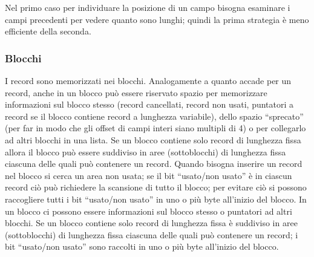 Nel primo caso per individuare la posizione di un campo bisogna esaminare i campi precedenti per
vedere quanto sono lunghi; quindi la prima strategia è meno efficiente della seconda. 

\subsubsection{Blocchi}
I record sono memorizzati nei blocchi. Analogamente a quanto accade per un record, anche in un blocco 
può essere riservato spazio per memorizzare informazioni sul blocco stesso (record cancellati, record 
non usati, puntatori a record se il blocco contiene record a lunghezza variabile), dello spazio 
``sprecato'' (per far in modo che gli offset di campi interi siano multipli di 4) o per collegarlo ad altri 
blocchi in una lista. Se un blocco contiene solo record di lunghezza fissa allora il blocco può essere 
suddiviso in aree (sottoblocchi) di lunghezza fissa ciascuna delle quali può contenere un record. Quando 
bisogna inserire un record nel blocco si cerca un area non usata; se il bit ``usato/non usato'' è in ciascun record
ciò può richiedere la scansione di tutto il blocco; per evitare ciò si possono raccogliere tutti i bit
``usato/non usato'' in uno o più byte all'inizio del blocco. 
In un blocco ci possono essere informazioni sul blocco stesso o puntatori ad altri blocchi.
Se un blocco contiene solo record di lunghezza fissa è suddiviso in aree (sottoblocchi) di lunghezza fissa
ciascuna delle quali può contenere un record; i bit ``usato/non usato'' sono raccolti in uno o più byte 
all'inizio del blocco.\\

